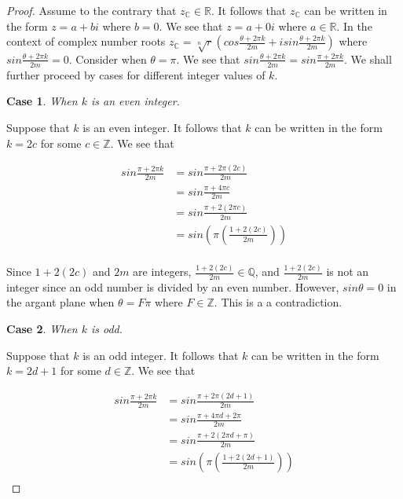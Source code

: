 \documentclass{turabian-researchpaper}
\newtheorem{case}{Case}
\begin{document}
\begin{proof}
    Assume to the contrary that \(z_{\mathds{C}} \in \mathds{R}\). It follows that \(z_{\mathds{C}}\) can be written in the form \(z = a + bi\) where \(b = 0\). We see that \(z = a + 0i\) where \(a \in \mathds{R}\). In the context of complex number roots \(z_{\mathds{C}} = {\sqrt[n]{r}}{\left(cos{\frac{\theta + {2\pi}k}{2m} + isin{\frac{\theta + {2\pi}k}{2m}}}\right)}\) where \(sin{\frac{\theta + {2\pi}k}{2m}} = 0\). Consider when \(\theta = \pi\). We see that \(sin{\frac{\theta + {2\pi}k}{2m}} = sin{\frac{\pi + {2\pi}k}{2m}}\). We shall further proceed by cases for different integer values of \(k\). 
    
    \begin{case}
        When \(k\) is an even integer.
    \end{case}

    Suppose that \(k\) is an even integer. It follows that \(k\) can be written in the form \(k = 2c\) for some \(c \in \mathds{Z}\). We see that 

    \begin{align*}
        sin{\frac{\pi + {2\pi}k}{2m}} &= sin{\frac{\pi + {2\pi}(2c)}{2m}} \\ 
                                      &= sin{\frac{\pi + {4\pi}c}{2m}} \\
                                      &= sin{\frac{\pi + 2(2{\pi}c)}{2m}} \\ 
                                      &= sin\left({\pi}\left({\frac{1 + 2(2c)}{2m}}\right)\right) \\ 
    \end{align*} 

    Since \(1 + 2(2c)\) and \(2m\) are integers, \(\frac{1 + 2(2c)}{2m} \in \mathds{Q}\), and \(\frac{1 + 2(2c)}{2m}\) is not an integer since an odd number is divided by an even number. However, \(sin\theta = 0\) in the argant plane when \(\theta = F\pi\) where \(F \in \mathds{Z}\). This is a a contradiction. 

    \begin{case}
        When \(k\) is odd. 
    \end{case} 

    Suppose that \(k\) is an odd integer. It follows that \(k\) can be written in the form \(k = 2d + 1\) for some \(d \in \mathds{Z}\). We see that 

    \begin{align*}
        sin{\frac{\pi + {2\pi}k}{2m}} &= sin{\frac{\pi + {2\pi}(2d + 1)}{2m}} \\ 
                                      &= sin{\frac{\pi + {4\pi}d + 2\pi}{2m}} \\
                                      &= sin{\frac{\pi + 2(2{\pi}d + \pi)}{2m}} \\ 
                                      &= sin\left({\pi}\left({\frac{1 + 2(2d + 1)}{2m}}\right)\right) \\ 
    \end{align*} 


\end{proof}
\end{document}
